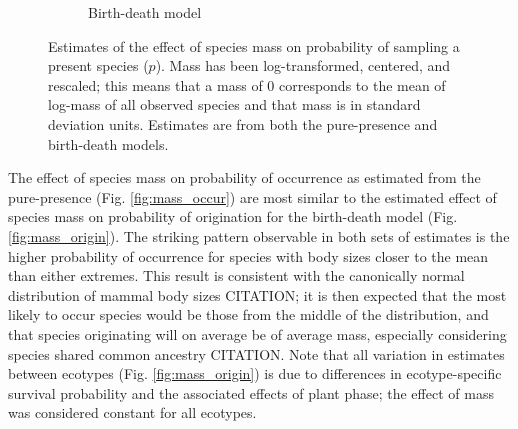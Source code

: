 \documentclass[12pt,letterpaper]{article}
\begin{document}
\begin{figure}[ht]
\begin{subfigure}[b]{0.45\textwidth}
    \caption{Birth-death model}
    \label{fig:mass_preserve_bd}
  \end{subfigure}
  \caption[Estimates of the effect of mass on observation probability]{Estimates of the effect of species mass on probability of sampling a present species (\(p\)). Mass has been log-transformed, centered, and rescaled; this means that a mass of 0 corresponds to the mean of log-mass of all observed species and that mass is in standard deviation units. Estimates are from both the pure-presence and birth-death models.}
  \label{fig:mass_preserve}
\end{figure}


The effect of species mass on probability of occurrence as estimated from the pure-presence (Fig. \ref{fig:mass_occur}) are most similar to the estimated effect of species mass on probability of origination for the birth-death model (Fig. \ref{fig:mass_origin}). The striking pattern observable in both sets of estimates is the higher probability of occurrence for species with body sizes closer to the mean than either extremes. This result is consistent with the canonically normal distribution of mammal body sizes CITATION; it is then expected that the most likely to occur species would be those from the middle of the distribution, and that species originating will on average be of average mass, especially considering species shared common ancestry CITATION. Note that all variation in estimates between ecotypes (Fig. \ref{fig:mass_origin}) is due to differences in ecotype-specific survival probability and the associated effects of plant phase; the effect of mass was considered constant for all ecotypes.
\end{document}
